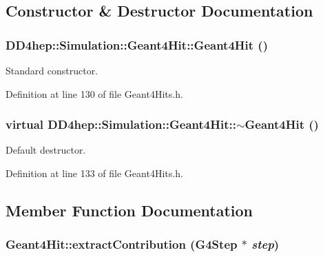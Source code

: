 \subsection{Constructor \& Destructor Documentation}
\hypertarget{class_d_d4hep_1_1_simulation_1_1_geant4_hit_a45eca144a88d313ce22aeaff75dedce1}{
\subsubsection[{Geant4Hit}]{\setlength{\rightskip}{0pt plus 5cm}DD4hep::Simulation::Geant4Hit::Geant4Hit ()}}
\label{class_d_d4hep_1_1_simulation_1_1_geant4_hit_a45eca144a88d313ce22aeaff75dedce1}


Standard constructor. 

Definition at line 130 of file Geant4Hits.h.\hypertarget{class_d_d4hep_1_1_simulation_1_1_geant4_hit_a26ed0cb1e754012a586523a107e9bc7c}{
\subsubsection[{$\sim$Geant4Hit}]{\setlength{\rightskip}{0pt plus 5cm}virtual DD4hep::Simulation::Geant4Hit::$\sim$Geant4Hit ()}}
\label{class_d_d4hep_1_1_simulation_1_1_geant4_hit_a26ed0cb1e754012a586523a107e9bc7c}


Default destructor. 

Definition at line 133 of file Geant4Hits.h.

\subsection{Member Function Documentation}
\hypertarget{class_d_d4hep_1_1_simulation_1_1_geant4_hit_a9ff079cd95ab9c22abca994fcdc31d97}{
\subsubsection[{extractContribution}]{ Geant4Hit::extractContribution (G4Step $\ast$ {\em step})}}
\label{class_d_d4hep_1_1_simulation_1_1_geant4_hit_a9ff079cd95ab9c22abca994fcdc31d97}


